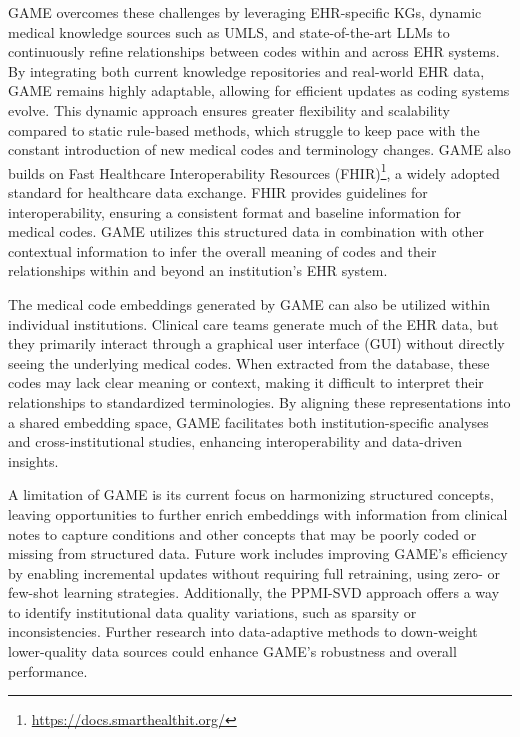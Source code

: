 \documentclass{article}
\begin{document}
GAME overcomes these challenges by leveraging EHR-specific KGs, dynamic medical knowledge sources such as UMLS, and state-of-the-art LLMs to continuously refine relationships between codes within and across EHR systems. By integrating both current knowledge repositories and real-world EHR data, GAME remains highly adaptable, allowing for efficient updates as coding systems evolve. This dynamic approach ensures greater flexibility and scalability compared to static rule-based methods, which struggle to keep pace with the constant introduction of new medical codes and terminology changes. GAME also builds on Fast Healthcare Interoperability Resources (FHIR)\footnote{\url{https://docs.smarthealthit.org/}}, a widely adopted standard for healthcare data exchange. FHIR provides guidelines for interoperability, ensuring a consistent format and baseline information for medical codes. GAME utilizes this structured data in combination with other contextual information to infer the overall meaning of codes and their relationships within and beyond an institution’s EHR system.


The medical code embeddings generated by GAME can also be utilized within individual institutions. Clinical care teams generate much of the EHR data, but they primarily interact through a graphical user interface (GUI) without directly seeing the underlying medical codes. When extracted from the database, these codes may lack clear meaning or context, making it difficult to interpret their relationships to standardized terminologies. By aligning these representations into a shared embedding space, GAME facilitates both institution-specific analyses and cross-institutional studies, enhancing interoperability and data-driven insights.


A limitation of GAME is its current focus on harmonizing structured concepts, leaving opportunities to further enrich embeddings with information from clinical notes to capture conditions and other concepts that may be poorly coded or missing from structured data. Future work includes improving GAME’s efficiency by enabling incremental updates without requiring full retraining, using zero- or few-shot learning strategies. Additionally, the PPMI-SVD approach offers a way to identify institutional data quality variations, such as sparsity or inconsistencies. Further research into data-adaptive methods to down-weight lower-quality data sources could enhance GAME’s robustness and overall performance. 
\end{document}
